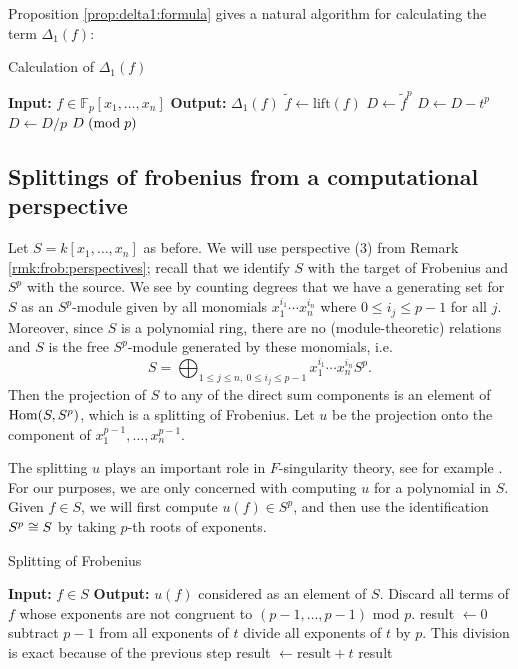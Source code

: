 Proposition \ref{prop:delta1:formula} gives a natural algorithm
for calculating the term \(\Delta_{1}(f)\): 

\begin{algorithm}[H]
\caption{Calculation of \(\Delta_{1}(f)\) }
	\label{alg:calc:delta1}
    \begin{algorithmic}[1]
		\State \textbf{Input:} \(f \in \mathbb{F}_{p}[x_{1}, \ldots, x_{n}]\) 
		\State \textbf{Output:} $\Delta_1(f)$
		\State \(\tilde{f} \gets \text{lift}(f)\) 
		\State \(D \gets \tilde{f}^{p}\) 
		    \State \(D \gets D - t^{p}\) 
		\EndFor
		\State \(D \gets D / p\)
		\State \Return \(D \; (\text{mod} \; p)\) 
	\end{algorithmic}
\end{algorithm}

\subsection{Splittings of frobenius from a computational perspective}

Let \(S = k[x_{1}, \ldots, x_{n}]\) as before. 
We will use perspective (3) from
Remark \ref{rmk:frob:perspectives}; 
recall that we identify 
\(S\) with the target of Frobenius and
\(S^{p}\) with the source.
We see 
by counting degrees
that we have a generating set for \(S\) as an
\(S^{p}\)-module given by
all monomials
\(x_{1}^{i_{1}}\cdots x_{n}^{i_{n}}\)
where \(0 \leq i_{j} \leq p-1\) for all \(j\).
Moreover, since \(S\) is a polynomial ring, 
there are no (module-theoretic) relations
and
\(S\) is the free \(S^{p}\)-module generated by 
these monomials, i.e.  \[
S = \bigoplus_{1 \leq j \leq n,~ 0 \leq i_{j} \leq p-1}^{} x_{1}^{i_{1}}\cdots x_{n}^{i_{n}} S^{p}
.\] 
Then the projection of \(S\) to any of the direct sum components
is an element of \(\operatorname{Hom}(S,S^{p})\), which is a
splitting of Frobenius.
Let \(u\) be the projection onto the component of
\(x_{1}^{p-1}, \ldots, x_{n}^{p-1}\).

The splitting \(u\) plays an important role in \(F\)-singularity
theory, see for example 
\cite[Claim~2.6]{ma-polstra-2021-F-sing-comm-alg}.
For our purposes, we are only concerned with computing \(u\) 
for a polynomial in \(S\). 
Given \(f \in S\), we will first compute
\(u(f) \in S^{p}\), and then use the identification
\(S^{p} \cong S\) by taking \(p\)-th roots of 
exponents.

\begin{algorithm}[H]
\caption{Splitting of Frobenius}
\label{alg:naive:u}
\begin{algorithmic}[1]
\State \textbf{Input:} \(f \in S\) 
\State \textbf{Output:} \(u(f)\) considered as an element of \(S\).
\State Discard all terms of \(f\) whose exponents are not congruent to
	\((p-1, \ldots, p-1)\) mod \(p\).
\State result \(\gets 0\)	
    \State subtract \(p-1\) from all exponents of \(t\)
    \State divide all exponents of \(t\) by \(p\).
    \Comment This division is exact because of the previous step
    \State result \(\gets \text{result} + t\)
\EndFor 
\State \Return result
\end{algorithmic}
\end{algorithm}

